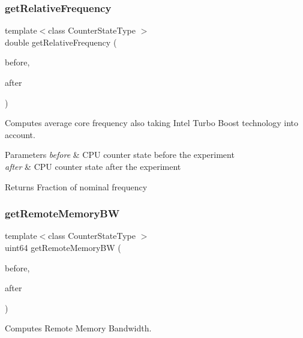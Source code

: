 \subsubsection{get\+Relative\+Frequency}
{\footnotesize\ttfamily template$<$class Counter\+State\+Type $>$ \\
double get\+Relative\+Frequency (\begin{DoxyParamCaption}\item[{const Counter\+State\+Type \&}]{before,  }\item[{const Counter\+State\+Type \&}]{after }\end{DoxyParamCaption})\hspace{0.3cm}{\ttfamily [friend]}}



Computes average core frequency also taking Intel Turbo Boost technology into account. 


\begin{DoxyParams}{Parameters}
{\em before} & C\+PU counter state before the experiment \\
\hline
{\em after} & C\+PU counter state after the experiment \\
\hline
\end{DoxyParams}
\begin{DoxyReturn}{Returns}
Fraction of nominal frequency 
\end{DoxyReturn}
\mbox{\label{classBasicCounterState_a00c97b1a7d8a7125ce7fd129cddb52e8}} 
\subsubsection{get\+Remote\+Memory\+BW}
{\footnotesize\ttfamily template$<$class Counter\+State\+Type $>$ \\
uint64 get\+Remote\+Memory\+BW (\begin{DoxyParamCaption}\item[{const Counter\+State\+Type \&}]{before,  }\item[{const Counter\+State\+Type \&}]{after }\end{DoxyParamCaption})\hspace{0.3cm}{\ttfamily [friend]}}



Computes Remote Memory Bandwidth. 

\mbox{\label{classBasicCounterState_a5e245473e2297272a50ca054b33c8c86}} 
